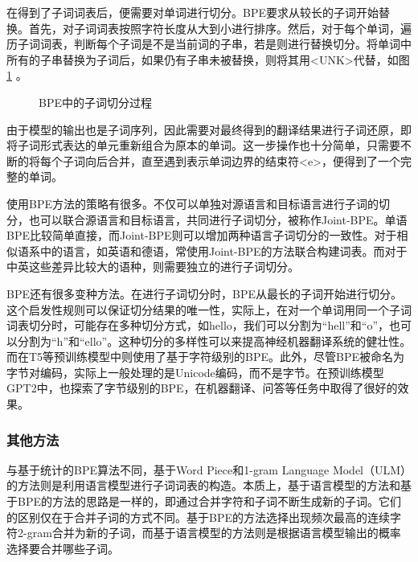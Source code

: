 \parinterval 在得到了子词词表后，便需要对单词进行切分。BPE要求从较长的子词开始替换。首先，对子词词表按照字符长度从大到小进行排序。然后，对于每个单词，遍历子词词表，判断每个子词是不是当前词的子串，若是则进行替换切分。将单词中所有的子串替换为子词后，如果仍有子串未被替换，则将其用<UNK>代替，如图\ref{fig:7-10} 。

\begin{figure}[htp]
\centering

\caption{BPE中的子词切分过程}
\label{fig:7-10}
\end{figure}

\parinterval 由于模型的输出也是子词序列，因此需要对最终得到的翻译结果进行子词还原，即将子词形式表达的单元重新组合为原本的单词。这一步操作也十分简单，只需要不断的将每个子词向后合并，直至遇到表示单词边界的结束符<e>，便得到了一个完整的单词。

\parinterval 使用BPE方法的策略有很多。不仅可以单独对源语言和目标语言进行子词的切分，也可以联合源语言和目标语言，共同进行子词切分，被称作Joint-BPE\cite{DBLP:conf/acl/SennrichHB16a}。单语BPE比较简单直接，而Joint-BPE则可以增加两种语言子词切分的一致性。对于相似语系中的语言，如英语和德语，常使用Joint-BPE的方法联合构建词表。而对于中英这些差异比较大的语种，则需要独立的进行子词切分。

\parinterval BPE还有很多变种方法。在进行子词切分时，BPE从最长的子词开始进行切分。这个启发性规则可以保证切分结果的唯一性，实际上，在对一个单词用同一个子词词表切分时，可能存在多种切分方式，如hello，我们可以分割为``hell''和``o''，也可以分割为``h''和``ello''。这种切分的多样性可以来提高神经机器翻译系统的健壮性\cite{DBLP:conf/acl/Kudo18}。而在T5等预训练模型中\cite{DBLP:journals/corr/abs-1910-10683}则使用了基于字符级别的BPE。此外，尽管BPE被命名为字节对编码，实际上一般处理的是Unicode编码，而不是字节。在预训练模型GPT2中，也探索了字节级别的BPE，在机器翻译、问答等任务中取得了很好的效果\cite{radford2019language}。


\subsubsection{其他方法}

\parinterval 与基于统计的BPE算法不同，基于Word Piece和1-gram Language Model（ULM）的方法则是利用语言模型进行子词词表的构造\cite{DBLP:conf/acl/Kudo18}。本质上，基于语言模型的方法和基于BPE的方法的思路是一样的，即通过合并字符和子词不断生成新的子词。它们的区别仅在于合并子词的方式不同。基于BPE的方法选择出现频次最高的连续字符2-gram合并为新的子词，而基于语言模型的方法则是根据语言模型输出的概率选择要合并哪些子词。

